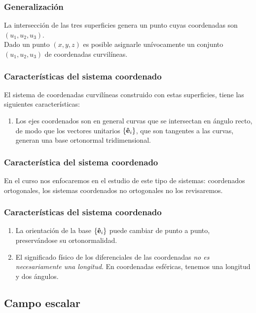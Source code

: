 \documentclass[12pt]{beamer}
\begin{document}
\begin{frame}
\frametitle{Generalización}   
La intersección de las tres superficies genera un punto cuyas coordenadas son $(u_{1}, u_{2}, u_{3})$.
\\
\bigskip
\pause
Dado un punto $(x, y, z)$ es posible asignarle unívocamente un conjunto $(u_{1}, u_{2}, u_{3})$ de coordenadas curvilíneas.
\end{frame}
\begin{frame}
\frametitle{Características del sistema coordenado}
El sistema de coordenadas curvilíneas construido con estas superficies, tiene las siguientes características:
\pause
{}
\begin{enumerate}[<+->]
\item Los ejes coordenados son en general curvas que se intersectan en ángulo recto, de modo que los vectores unitarios $\left\{ \vu{e}_{i} \right\}$, que son tangentes a las curvas, generan una base ortonormal tridimensional.
\seti
\end{enumerate}
\end{frame}
\begin{frame}
\frametitle{Característica del sistema coordenado}
En el curso nos enfocaremos en el estudio de este tipo de sistemas: coordenados ortogonales, los sistemas coordenados no ortogonales no los revisaremos.
\end{frame}
\begin{frame}
\frametitle{Características del sistema coordenado}
\begin{enumerate}[<+->]
\conti
\item La orientación de la base $\left\{ \vu{e}_{i} \right\}$ puede cambiar de punto a punto, preservándose su ortonormalidad.
\item El significado físico de los diferenciales de las coordenadas \emph{no es necesariamente una longitud}. En coordenadas esféricas, tenemos una longitud y dos ángulos.
\end{enumerate}
\end{frame}

\subsection*{Campo escalar}
\end{document}
